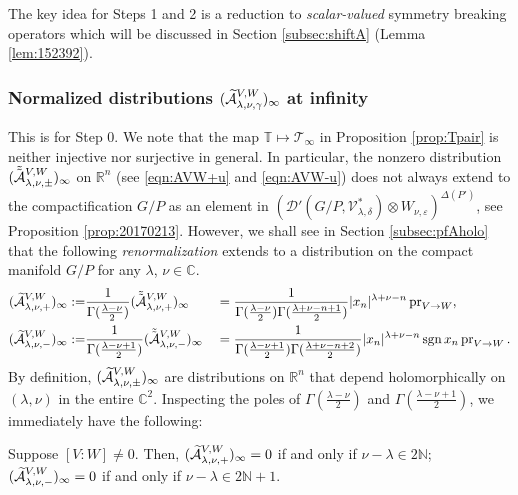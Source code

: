 \vskip 1pc
The key idea for Steps 1 and 2
 is a reduction 
 to {\it{scalar-valued}} symmetry breaking operators
 which will be discussed
 in Section \ref{subsec:shiftA}
 (Lemma \ref{lem:152392}).  


\subsubsection{Normalized distributions
 $(\widetilde{{\mathcal{A}}}_{{\lambda},{\nu},{\gamma}}^{{V,W}})_{\infty}$
 at infinity}
\label{subsec:Ainfty}
This is for Step 0.  
We note that the map ${\mathbb{T}} \mapsto {\mathcal{T}}_{\infty}$
 in Proposition \ref{prop:Tpair}
 is neither injective nor surjective
 in general.  
In particular,
 the nonzero distribution $(\tilde{\tilde{{\mathcal{A}}}}_{{\lambda},{\nu},{\pm}}^{{V,W}})_{\infty}$
 on ${\mathbb{R}}^n$
 (see \eqref{eqn:AVW+u} and \eqref{eqn:AVW-u})
 does not always extend
 to the compactification $G/P$ as an element 
in $({\mathcal{D}}'(G/P, {\mathcal{V}}_{\lambda,\delta}^{\ast}) \otimes W_{\nu,\varepsilon})^{\Delta(P')}$, 
 see Proposition \ref{prop:20170213}.  
However,
 we shall see in Section \ref{subsec:pfAholo}
 that the following {\it{renormalization}} extends to a distribution 
on the compact manifold $G/P$
 for any $\lambda$, $\nu \in {\mathbb{C}}$.  
\begin{alignat*}{2}
  (\widetilde{{\mathcal{A}}}_{{\lambda},{\nu},{+}}^{{V,W}})_{\infty}
  :=& \frac{1}{\Gamma(\frac{\lambda-\nu}{2})}(\tilde{\tilde{{\mathcal{A}}}}_{{\lambda},{\nu},{+}}^{{V,W}})_{\infty}
  &&= \frac{1}{\Gamma(\frac{\lambda-\nu}{2}) \Gamma(\frac{\lambda+\nu-n+1}{2})}
       |x_n|^{\lambda + \nu -n} \operatorname{pr}_{{V}\to{W}}, 
\\
  (\widetilde{{\mathcal{A}}}_{{\lambda},{\nu},{-}}^{{V,W}})_{\infty}
  :=& \frac{1}{\Gamma(\frac{\lambda-\nu+1}{2})}(\tilde{\tilde{{\mathcal{A}}}}_{{\lambda},{\nu},{-}}^{{V,W}})_{\infty}
  &&= \frac{1}{\Gamma(\frac{\lambda-\nu+1}{2}) \Gamma(\frac{\lambda+\nu-n+2}{2})}
   |x_n|^{\lambda + \nu -n} \operatorname{sgn} x_n\operatorname{pr}_{{V}\to{W}}.  
\end{alignat*}
By definition, 
 $(\widetilde{{\mathcal{A}}}_{{\lambda},{\nu},{\pm}}^{{V,W}})_{\infty}$ are distributions
 on ${\mathbb{R}}^n$ 
 that depend holomorphically on $(\lambda, \nu)$ in the entire ${\mathbb{C}}^2$.  
Inspecting the poles of $\Gamma(\frac{\lambda-\nu}{2})$ and 
$\Gamma(\frac{\lambda-\nu+1}{2})$, 
 we immediately have the following:


\begin{lemma}
\label{lem:ABzero}
Suppose $[V:W] \ne 0$.  
Then, 
$(\widetilde{{\mathcal{A}}}_{{\lambda},{\nu},{+}}^{{V,W}})_{\infty}=0$
 if and only if $\nu - \lambda \in 2 {\mathbb{N}}$;
 $(\widetilde{{\mathcal{A}}}_{{\lambda},{\nu},{-}}^{{V,W}})_{\infty}=0$
 if and only if $\nu - \lambda \in 2 {\mathbb{N}}+1$.  
\end{lemma}

